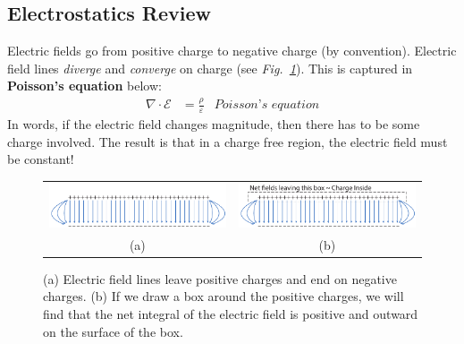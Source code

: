 \subsection{Electrostatics Review }
Electric fields go from positive charge to negative charge (by convention).  Electric field lines \emph{diverge} and \emph{converge} on charge (see \emph{Fig.~\ref{fig:mod2-2_ICtech_sld_11}}).  This is captured in \textbf{Poisson's equation} below:
    \begin{align} 
        \nabla \cdot \mathcal{E} &= \frac{\rho}{\varepsilon} &\textit{Poisson's equation}
    \end{align}
In words, if the electric field changes magnitude, then there has to be some charge involved.  The result is that in a charge free region, the electric field must be constant!
\begin{figure}[tb]
\centering
\begin{tabular}{cc}
\includegraphics[width=.45\columnwidth]{charge_fields} &
\includegraphics[width=.45\columnwidth]{charge_fields_guass}\\
(a) & (b)\\
\end{tabular}
\caption{(a) Electric field lines leave positive charges and end on negative charges.  (b) If we draw a box around the positive charges, we will find that the net integral of the electric field is positive and outward on the surface of the box.}
\label{fig:mod2-2_ICtech_sld_11}
\end{figure}

